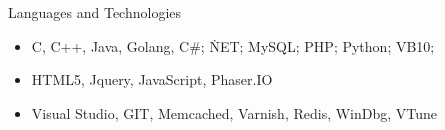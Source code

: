 \documentclass[]{mcdowellcv}
\begin{document}
	\begin{cvsection}{Languages and Technologies}
		\begin{cvsubsection}{}{}{}	
			\begin{itemize}
				\item  C, C++, Java, Golang, C\#; \.NET; MySQL; PHP; Python; VB10; 
				\item HTML5, Jquery, JavaScript, Phaser.IO
				\item Visual Studio, GIT, Memcached, Varnish, Redis, WinDbg, VTune
			\end{itemize}
		\end{cvsubsection}
	\end{cvsection}
	
\end{document}
